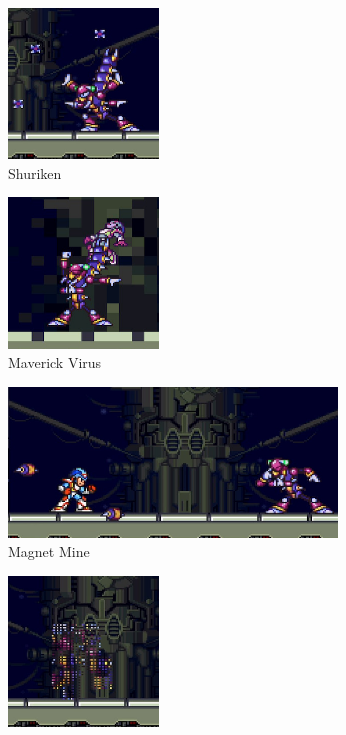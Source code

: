 \begin{figure}[htp]
	\centering
	\begin{subfigure}{0.4\linewidth}
		\centering
		\includegraphics[height=4cm]{figures/X2/Magna_centipede/Centipede_shuriken.png}
		\caption{Shuriken}
	\end{subfigure}
	\begin{subfigure}{0.4\linewidth}
		\centering
		\includegraphics[height=4cm]{figures/X2/Magna_centipede/Centipede_injection.png}
		\caption{Maverick Virus}
	\end{subfigure}
	\begin{subfigure}{\linewidth}
		\centering
		\includegraphics[height= 4cm]{figures/X2/Magna_centipede/Centipede_magnet.png}
		\caption{Magnet Mine}
	\end{subfigure}
	\begin{subfigure}{0.4\linewidth}
		\centering
		\includegraphics[height=4cm]{figures/X2/Magna_centipede/Centipede_teleport.png}

\end{subfigure}
\end{figure}
